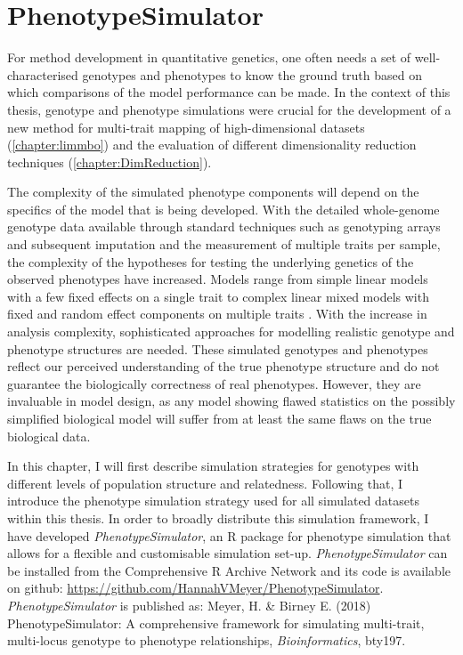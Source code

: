 \chapter{PhenotypeSimulator}
\label{chapter:simulation} 
For method development in quantitative genetics, one often needs a set of well-characterised genotypes and phenotypes to know the ground truth based on which comparisons of the model performance can be made. In the context of this thesis, genotype and phenotype simulations were crucial for the development of a new method for multi-trait mapping of high-dimensional datasets (\cref{chapter:limmbo}) and the evaluation of different dimensionality reduction techniques (\cref{chapter:DimReduction}).

The complexity of the simulated phenotype components will depend on the specifics of the model that is being developed. With the detailed whole-genome genotype data available through standard techniques such as genotyping arrays and subsequent imputation and the measurement of multiple traits per sample, the complexity of the hypotheses for testing the underlying genetics of the observed phenotypes have increased. Models range from simple linear models with a few fixed effects on a single trait to complex linear mixed models with fixed and random effect components on multiple traits \citep{Stephens2013,Marigorta2014,Zhou2014,Loh2014}. With the increase in analysis complexity, sophisticated approaches for modelling realistic genotype and phenotype structures are needed. These simulated genotypes and phenotypes reflect our perceived understanding of the true phenotype structure and do not guarantee the biologically correctness of real phenotypes. However, they are invaluable in model design, as any model showing flawed statistics on the possibly simplified biological model will suffer from at least the same flaws on the true biological data.

In this chapter, I will first describe simulation strategies for genotypes with different levels of population structure and relatedness. Following that, I introduce the phenotype simulation strategy used for all simulated datasets within this thesis. In order to broadly distribute this simulation framework, I have developed \textit{PhenotypeSimulator}, an R package for phenotype simulation that allows for a flexible and customisable simulation set-up. \textit{PhenotypeSimulator} can be installed from the Comprehensive R Archive Network \citep{Meyer2017} and its code is available on github: \url{https://github.com/HannahVMeyer/PhenotypeSimulator}. \textit{PhenotypeSimulator} is published as: Meyer, H. \& Birney E. (2018) PhenotypeSimulator: A comprehensive framework for simulating multi-trait, multi-locus genotype to phenotype relationships, \textit{Bioinformatics}, bty197. 

